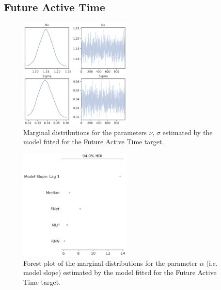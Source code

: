\subsection{Future Active Time}
\label{future_abs_bayes_2}

\begin{figure}[ht]
\centering
\includegraphics[width=0.5\textwidth]{images/appendix_C/Future Active Time_marginals_2.png}
\caption[\textbf{Future active time marginal distributions}]{Marginal distributions for the parameters $\nu$, $\sigma$ estimated by the model fitted for the Future Active Time target.}
\label{marginals_act_2}
\end{figure}
\FloatBarrier

\begin{figure}[ht]
\centering
\includegraphics[width=0.5\textwidth]{images/appendix_C/Future Active Time_models_2.png}
\caption[\textbf{Future active time model fixed effect}]{Forest plot of the marginal distributions for the parameter $\alpha$ (i.e. model slope) estimated by the model fitted for the Future Active Time target.}
\label{model_act_2}
\end{figure}
\FloatBarrier

